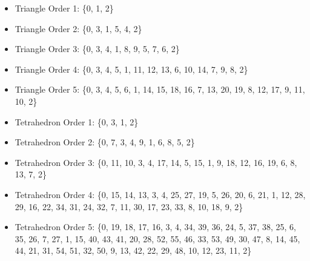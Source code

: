 \begin{mybox}
\begin{itemize}
	\item Triangle Order 1: \{0, 1, 2\}
	\item Triangle Order 2: \{0, 3, 1, 5, 4, 2\}
	\item Triangle Order 3: \{0, 3, 4, 1, 8, 9, 5, 7, 6, 2\}
	\item Triangle Order 4: \{0, 3, 4, 5, 1, 11, 12, 13, 6, 10, 14, 7, 9, 8, 2\}
	\item Triangle Order 5: \{0, 3, 4, 5, 6, 1, 14, 15, 18, 16, 7, 13, 20, 19, 8, 12, 17, 9, 11, 10, 2\}
	
	\item Tetrahedron Order 1: \{0, 3, 1, 2\}
	\item Tetrahedron Order 2: \{0, 7, 3, 4, 9, 1, 6, 8, 5, 2\}
	\item Tetrahedron Order 3: \{0, 11, 10, 3, 4, 17, 14, 5, 15, 1, 9, 18, 12, 16, 19, 6, 8, 13, 7, 2\}
	\item Tetrahedron Order 4: \{0, 15, 14, 13, 3, 4, 25, 27, 19, 5, 26, 20, 6, 21, 1, 12, 28, 29, 16, 22, 34, 31, 24, 32, 7, 11, 30, 17, 23, 33, 8, 10, 18, 9, 2\}
	\item Tetrahedron Order 5: \{0, 19, 18, 17, 16, 3, 4, 34, 39, 36, 24, 5, 37, 38, 25, 6, 35, 26, 7, 27, 1, 15, 40, 43, 41, 20, 28, 52, 55, 46, 33, 53, 49, 30, 47, 8, 14, 45, 44, 21, 31, 54, 51, 32, 50, 9, 13, 42, 22, 29, 48, 10, 12, 23, 11, 2\}
\end{itemize}
\end{mybox}